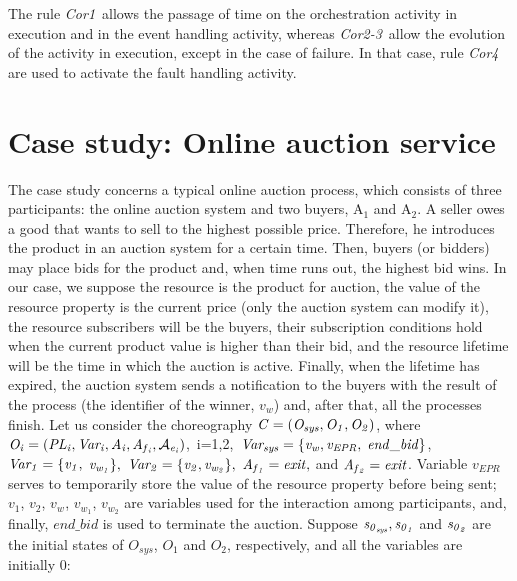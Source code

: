 The rule {\it Cor1}\ allows the passage of time on the
orchestration activity in execution and in the event handling activity, whereas
{\it Cor2-3}\, allow the evolution of the activity in execution,
except in the case of failure. In that case, rule {\it Cor4}\,
are used to activate the fault handling activity.


\section*{Case study: Online auction service}\label{cs}
The case study concerns a typical online auction process, which consists of three participants:
the online auction system and two buyers, A$_1$ and A$_2$. A seller owes a good that wants to sell to the highest possible price. Therefore, he introduces the product
in an auction system for a certain time. Then, buyers (or bidders) may place bids for the product and, when time runs out, the highest bid wins. In our case, we suppose the resource is the product for auction, the value of the resource property is the current price (only the auction system can modify it), the resource subscribers will be the buyers, their subscription conditions hold when the current product value is higher than their bid, and the resource lifetime will be the time in which the auction is active. Finally, when the lifetime has expired, the auction system sends a notification to the buyers with the result of the process (the identifier of the winner, $v_w$) and, after that, all the processes finish. Let us consider the choreography ${\it C=(O_{sys},O_1,O_2)}$, where
${\it O_i=(PL_i,Var_i,A_i,A_{f{_i}},\mathcal{A}_{e{_i}})}$,~i=1,2,~${\it Var_{sys}=\{v_w,v_{EPR},}$
${\it end\_bid\}}$,~${\it Var_1=\{v_1,}$ ${\it v_{w{_1}}\},\ Var_2=\{v_2,v_{w_{2}}\},\ A_{f{_1}}=exit,}$ and
${\it A_{f{_2}}=exit}$. Variable $v_{EPR}$ serves to temporarily store the value of the resource property before being sent; $v_1$, $v_2$, $v_{w_{}}$, $v_{w_{1}}$, $v_{w_{2}}$ are variables used for the interaction among participants, and, finally, $end\_bid$ is used to terminate the auction. Suppose ${\it s_{0{_{sys}}}, s_{0{_1}}}$ and ${\it s_{0{_2}}}$ are the initial states of $O_{sys}$, $O_1$ and $O_2$, respectively, and all the variables are initially $0$: \\[-0.2cm]

\vspace{-0.5cm}

\small

